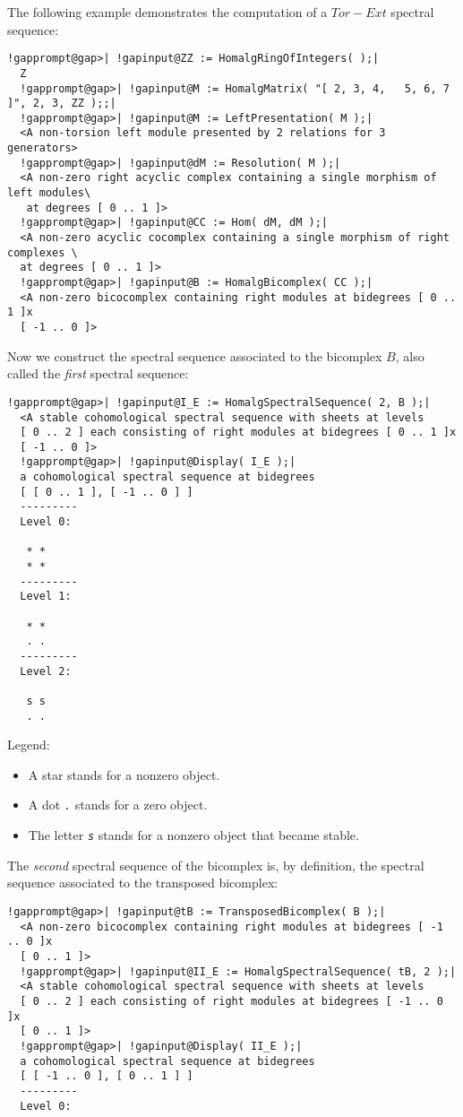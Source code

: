 \documentclass[a4paper,11pt]{report}
\begin{document}
{{{ The following example demonstrates the computation of a $Tor-Ext$ spectral sequence: 
\begin{Verbatim}[commandchars=!@|,fontsize=\small,frame=single,label=Example]
  !gapprompt@gap>| !gapinput@ZZ := HomalgRingOfIntegers( );|
  Z
  !gapprompt@gap>| !gapinput@M := HomalgMatrix( "[ 2, 3, 4,   5, 6, 7 ]", 2, 3, ZZ );;|
  !gapprompt@gap>| !gapinput@M := LeftPresentation( M );|
  <A non-torsion left module presented by 2 relations for 3 generators>
  !gapprompt@gap>| !gapinput@dM := Resolution( M );|
  <A non-zero right acyclic complex containing a single morphism of left modules\
   at degrees [ 0 .. 1 ]>
  !gapprompt@gap>| !gapinput@CC := Hom( dM, dM );|
  <A non-zero acyclic cocomplex containing a single morphism of right complexes \
  at degrees [ 0 .. 1 ]>
  !gapprompt@gap>| !gapinput@B := HomalgBicomplex( CC );|
  <A non-zero bicocomplex containing right modules at bidegrees [ 0 .. 1 ]x
  [ -1 .. 0 ]>
\end{Verbatim}
 Now we construct the spectral sequence associated to the bicomplex $B$, also called the \emph{first} spectral sequence: 
\begin{Verbatim}[commandchars=!@|,fontsize=\small,frame=single,label=Example]
  !gapprompt@gap>| !gapinput@I_E := HomalgSpectralSequence( 2, B );|
  <A stable cohomological spectral sequence with sheets at levels 
  [ 0 .. 2 ] each consisting of right modules at bidegrees [ 0 .. 1 ]x
  [ -1 .. 0 ]>
  !gapprompt@gap>| !gapinput@Display( I_E );|
  a cohomological spectral sequence at bidegrees
  [ [ 0 .. 1 ], [ -1 .. 0 ] ]
  ---------
  Level 0:
  
   * *
   * *
  ---------
  Level 1:
  
   * *
   . .
  ---------
  Level 2:
  
   s s
   . .
\end{Verbatim}
 Legend: 
\begin{itemize}
\item A star \mbox{\texttt{\mdseries\slshape *}} stands for a nonzero object.
\item A dot \mbox{\texttt{\mdseries\slshape .}} stands for a zero object.
\item The letter \mbox{\texttt{\mdseries\slshape s}} stands for a nonzero object that became stable.
\end{itemize}
 

 The \emph{second} spectral sequence of the bicomplex is, by definition, the spectral sequence
associated to the transposed bicomplex: 
\begin{Verbatim}[commandchars=!@|,fontsize=\small,frame=single,label=Example]
  !gapprompt@gap>| !gapinput@tB := TransposedBicomplex( B );|
  <A non-zero bicocomplex containing right modules at bidegrees [ -1 .. 0 ]x
  [ 0 .. 1 ]>
  !gapprompt@gap>| !gapinput@II_E := HomalgSpectralSequence( tB, 2 );|
  <A stable cohomological spectral sequence with sheets at levels 
  [ 0 .. 2 ] each consisting of right modules at bidegrees [ -1 .. 0 ]x
  [ 0 .. 1 ]>
  !gapprompt@gap>| !gapinput@Display( II_E );|
  a cohomological spectral sequence at bidegrees
  [ [ -1 .. 0 ], [ 0 .. 1 ] ]
  ---------
  Level 0:
  

\end{Verbatim}}}}
\end{document}
